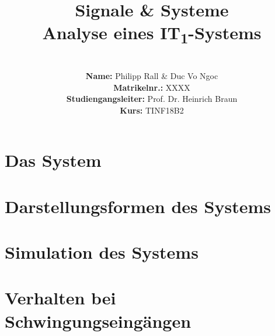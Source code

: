 \documentclass{article}
\title{\textbf{Signale \& Systeme \\ Analyse eines IT\textsubscript{1}-Systems}}
\author{
\vspace{8em} \\
\textbf{Name:} Philipp Rall \& Duc Vo Ngoc \\
\textbf{Matrikelnr.:} XXXX   \\
\textbf{Studiengangsleiter:} Prof. Dr. Heinrich Braun\\
\textbf{Kurs:} TINF18B2 \\
\vspace{8em} 
}
\begin{document}
\maketitle
\newpage
\section{Das System}



\section{Darstellungsformen des Systems}



\section{Simulation des Systems}





\section{Verhalten bei Schwingungseingängen}



\end{document}
